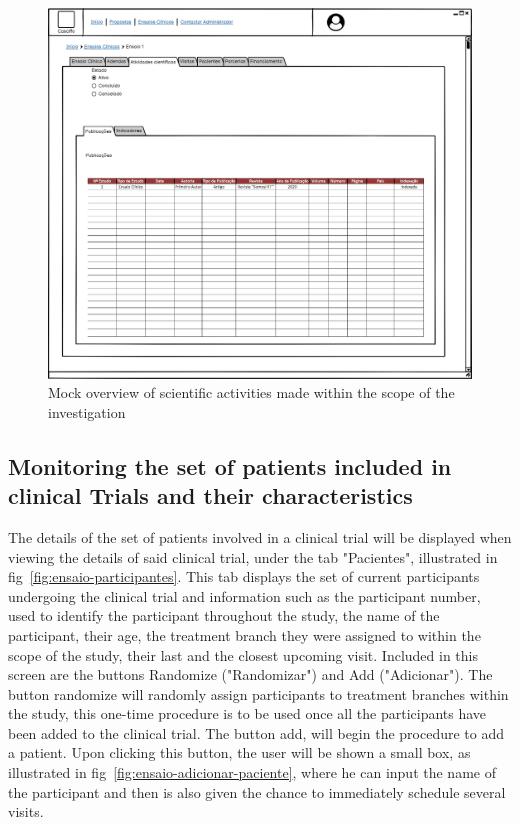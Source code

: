 \begin{figure}[H]
    \centering
    \includegraphics[scale=0.35]{images/ensaio-atividades-cientificas.png}
    \caption{Mock overview of scientific activities made within the scope of the investigation}
    \label{fig:ensaio-atividades-cientificas}
\end{figure}


\subsection{Monitoring the set of patients included in clinical Trials and their characteristics}
\label{subsec:monitor-set-of-patients}
The details of the set of patients involved in a clinical trial will be displayed when viewing the details of said clinical trial, under the tab "Pacientes", illustrated in fig~\ref{fig:ensaio-participantes}. This tab displays the set of current participants undergoing the clinical trial and information such as the participant number, used to identify the participant throughout the study, the name of the participant, their age, the treatment branch they were assigned to within the scope of the study, their last and the closest upcoming visit.  
Included in this screen are the buttons Randomize ("Randomizar") and Add ("Adicionar").
The button randomize will randomly assign participants to treatment branches within the study, this one-time procedure is to be used once all the participants have been added to the clinical trial. %
The button add, will begin the procedure to add a patient. Upon clicking this button, the user will be shown a small box, as illustrated in fig~\ref{fig:ensaio-adicionar-paciente}, where he can input the name of the participant and then is also given the chance to immediately schedule several visits.

